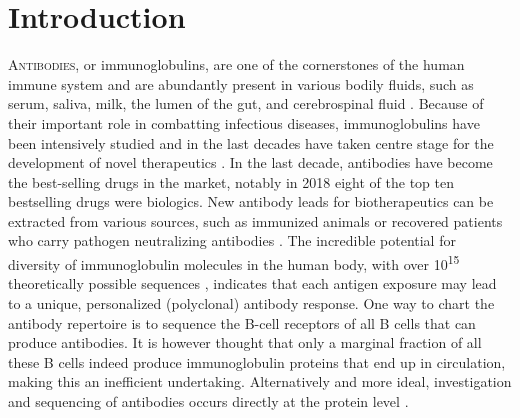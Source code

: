 \section{Introduction}
\lettrine[lraise=0.1, nindent=0em, slope=-.5em]{A}{ntibodies}, or immunoglobulins, are one of the cornerstones of the human immune system and are abundantly present in various bodily fluids, such as serum, saliva, milk, the lumen of the gut, and cerebrospinal fluid \cite{schroeder2010structure}. Because of their important role in combatting infectious diseases, immunoglobulins have been intensively studied and in the last decades have taken centre stage for the development of novel therapeutics \cite{kaplon2021antibodies, marks2020how, raybould2020thera-sabdab:}. In the last decade, antibodies have become the best-selling drugs in the market, notably in 2018 eight of the top ten bestselling drugs were biologics.
New antibody leads for biotherapeutics can be extracted from various sources, such as immunized animals or recovered patients who carry pathogen neutralizing antibodies \cite{bornholdt2016isolation, corti2016protective, valgardsdottir2021identification}. The incredible potential for diversity of immunoglobulin molecules in the human body, with over 10\textsuperscript{15} theoretically possible sequences \cite{schroederjr.2006similarity, briney2019commonality}, indicates that each antigen exposure may lead to a unique, personalized (polyclonal) antibody response. One way to chart the antibody repertoire is to sequence the B-cell receptors of all B cells that can produce antibodies. It is however thought that only a marginal fraction of all these B cells indeed produce immunoglobulin proteins that end up in circulation, making this an inefficient undertaking. Alternatively and more ideal, investigation and sequencing of antibodies occurs directly at the protein level \cite{hom2022exploring}.
